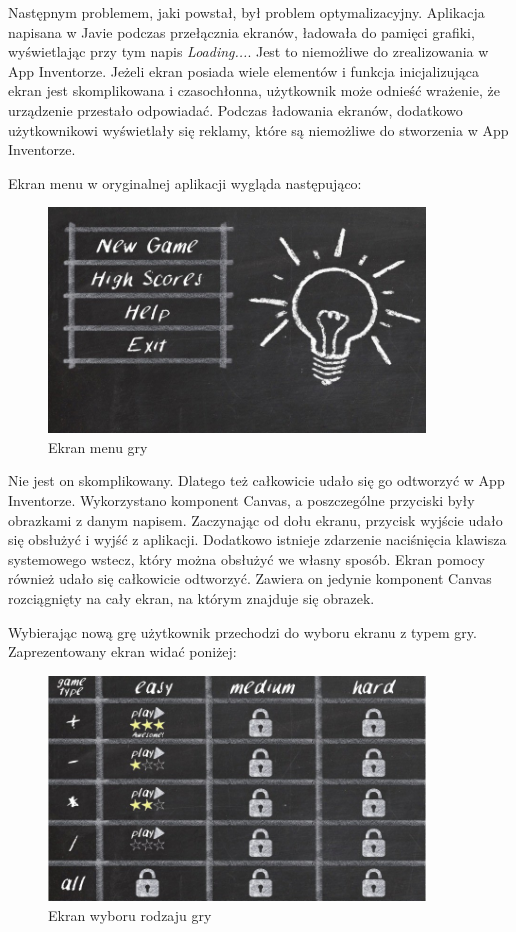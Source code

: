 Następnym problemem, jaki powstał, był problem optymalizacyjny. Aplikacja napisana w Javie podczas przełącznia ekranów, ładowała do pamięci grafiki, wyświetlając przy tym napis \emph{Loading...}. Jest to niemożliwe do zrealizowania w App Inventorze. Jeżeli ekran posiada wiele elementów i funkcja inicjalizująca ekran jest skomplikowana i czasochłonna, użytkownik może odnieść wrażenie, że urządzenie przestało odpowiadać. Podczas ładowania ekranów, dodatkowo użytkownikowi wyświetlały się reklamy, które są niemożliwe do stworzenia w App Inventorze.

Ekran menu w oryginalnej aplikacji wygląda następująco:

\begin{figure}[H]
\centering\includegraphics[width=10cm]{figures/apps/thinkfaster_menu}
\caption{Ekran menu gry}
\end{figure}

Nie jest on skomplikowany. Dlatego też całkowicie udało się go odtworzyć w App Inventorze. Wykorzystano komponent Canvas, a poszczególne przyciski były obrazkami z danym napisem. Zaczynając od dołu ekranu, przycisk wyjście udało się obsłużyć i wyjść z aplikacji. Dodatkowo istnieje zdarzenie naciśnięcia klawisza systemowego wstecz, który można obsłużyć we własny sposób. Ekran pomocy również udało się całkowicie odtworzyć. Zawiera on jedynie komponent Canvas rozciągnięty na cały ekran, na którym znajduje się obrazek.

Wybierając nową grę użytkownik przechodzi do wyboru ekranu z typem gry. Zaprezentowany ekran widać poniżej:

\begin{figure}[H]
\centering\includegraphics[width=10cm]{figures/apps/thinkfaster_gametype}
\caption{Ekran wyboru rodzaju gry}
\end{figure}

